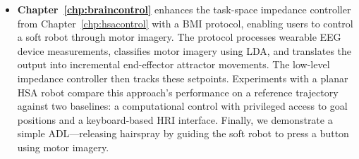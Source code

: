 \begin{itemize}
    \item \textbf{Chapter~\ref{chp:braincontrol}} enhances the task-space impedance controller from Chapter~\ref{chp:hsacontrol} with a \gls{BMI} protocol, enabling users to control a soft robot through motor imagery. The protocol processes wearable \gls{EEG} device measurements, classifies motor imagery using \gls{LDA}, and translates the output into incremental end-effector attractor movements. The low-level impedance controller then tracks these setpoints. Experiments with a planar \gls{HSA} robot compare this approach's performance on a reference trajectory against two baselines: a computational control with privileged access to goal positions and a keyboard-based \gls{HRI} interface. Finally, we demonstrate a simple \gls{ADL}—releasing hairspray by guiding the soft robot to press a button using motor imagery.  

\end{itemize}
